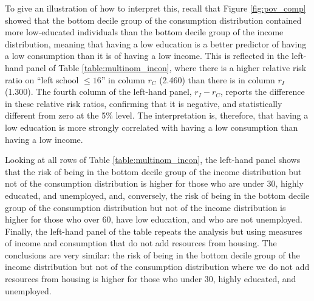 To give an illustration of how to interpret this, recall that Figure \ref{fig:pov_comp} showed that the bottom decile group of the consumption distribution contained more low-educated individuals than the bottom decile group of the income distribution, meaning that having a low education is a better predictor of having a low consumption than it is of having a low income. This is reflected in the left-hand panel of Table \ref{table:multinom_incon}, where there is a higher relative risk ratio on ``left school $\leq16$'' in column $r_{C}$ (2.460) than there is in column $r_{I}$ (1.300). The fourth column of the left-hand panel, $r_{I}-r_{C}$, reports the difference in these relative risk ratios, confirming that it is negative, and statistically different from zero at the 5\% level. The interpretation is, therefore, that  having a low education is more strongly correlated with having a low consumption than having a low income.

Looking at all rows of Table \ref{table:multinom_incon}, the left-hand panel shows that the risk of being in the bottom decile group of the income distribution but not of the consumption distribution is higher for those who are under 30, highly educated, and unemployed, and, conversely, the risk of being in the bottom decile group of the consumption distribution but not of the income distribution is higher for those who over 60, have low education, and who are not unemployed.  Finally, the left-hand panel of the table repeats the analysis but using measures of income and consumption that do not add resources from housing. The conclusions are very similar: the risk of being in the bottom decile group of the income distribution but not of the consumption distribution where we do not add resources from housing is higher for those who under 30, highly educated, and unemployed.

